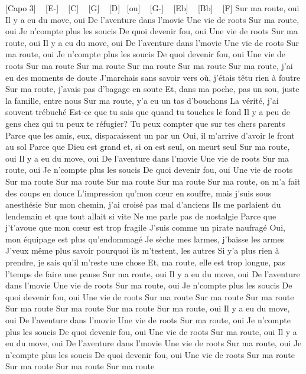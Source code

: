 [Capo 3] ~ [E-] ~ [C] ~ [G] ~ [D] ~[ou] ~ [G-] ~ [Eb] ~ [Bb] ~ [F]
Sur ma route, oui
Il y a eu du move, oui
De l'aventure dans l'movie
Une vie de roots
Sur ma route, oui
Je n'compte plus les soucis
De quoi devenir fou, oui
Une vie de roots
Sur ma route, oui
Il y a eu du move, oui
De l'aventure dans l'movie
Une vie de roots
Sur ma route, oui
Je n'compte plus les soucis
De quoi devenir fou, oui
Une vie de roots
Sur ma route
Sur ma route
Sur ma route
Sur ma route
Sur ma route, j'ai eu des moments de doute
J'marchais sans savoir vers où, j'étais têtu rien à foutre
Sur ma route, j'avais pas d'bagage en soute
Et, dans ma poche, pas un sou, juste la famille, entre nous
Sur ma route, y'a eu un tas d'bouchons
La vérité, j'ai souvent trébuché
Est-ce que tu sais que quand tu touches le fond
Il y a peu de gens chez qui tu peux te réfugier?
Tu peux compter que sur tes chers parents
Parce que les amis, eux, disparaissent un par un
Oui, il m'arrive d'avoir le front au sol
Parce que Dieu est grand et, si on est seul, on meurt seul
Sur ma route, oui
Il y a eu du move, oui
De l'aventure dans l'movie
Une vie de roots
Sur ma route, oui
Je n'compte plus les soucis
De quoi devenir fou, oui
Une vie de roots
Sur ma route
Sur ma route
Sur ma route
Sur ma route
Sur ma route, on m'a fait des coups en douce
L'impression qu'mon cœur en souffre, mais j'suis sous anesthésie
Sur mon chemin, j'ai croisé pas mal d'anciens
Ils me parlaient du lendemain et que tout allait si vite
Ne me parle pas de nostalgie
Parce que j't'avoue que mon cœur est trop fragile
J'suis comme un pirate naufragé
Oui, mon équipage est plus qu'endommagé
Je sèche mes larmes, j'baisse les armes
J'veux même plus savoir pourquoi ils m'testent, les autres
Si y'a plus rien à prendre, je sais qu'il m'reste une chose
Et, ma route, elle est trop longue, pas l'temps de faire une pause
Sur ma route, oui
Il y a eu du move, oui
De l'aventure dans l'movie
Une vie de roots
Sur ma route, oui
Je n'compte plus les soucis
De quoi devenir fou, oui
Une vie de roots
Sur ma route
Sur ma route
Sur ma route
Sur ma route
Sur ma route
Sur ma route
Sur ma route, oui
Il y a eu du move, oui
De l'aventure dans l'movie
Une vie de roots
Sur ma route, oui
Je n'compte plus les soucis
De quoi devenir fou, oui
Une vie de roots
Sur ma route, oui
Il y a eu du move, oui
De l'aventure dans l'movie
Une vie de roots
Sur ma route, oui
Je n'compte plus les soucis
De quoi devenir fou, oui
Une vie de roots
Sur ma route
Sur ma route
Sur ma route
Sur ma route